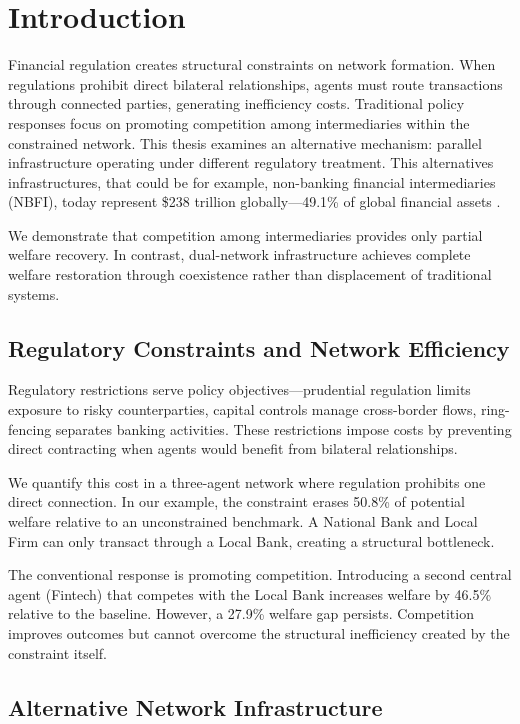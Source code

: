 \chapter{Introduction}\label{chapter:Intro}

Financial regulation creates structural constraints on network formation. When regulations prohibit direct bilateral relationships, agents must route transactions through connected parties, generating inefficiency costs. Traditional policy responses focus on promoting competition among intermediaries within the constrained network. This thesis examines an alternative mechanism: parallel infrastructure operating under different regulatory treatment. This alternatives infrastructures, that could be for example, non-banking financial intermediaries (NBFI), today represent \$238 trillion globally—49.1\% of global financial assets \cite{board_global_2024}.

We demonstrate that competition among intermediaries provides only partial welfare recovery. In contrast, dual-network infrastructure achieves complete welfare restoration through coexistence rather than displacement of traditional systems.

\section{Regulatory Constraints and Network Efficiency}

Regulatory restrictions serve policy objectives—prudential regulation limits exposure to risky counterparties, capital controls manage cross-border flows, ring-fencing separates banking activities. These restrictions impose costs by preventing direct contracting when agents would benefit from bilateral relationships.

We quantify this cost in a three-agent network where regulation prohibits one direct connection. In our example, the constraint erases 50.8\% of potential welfare relative to an unconstrained benchmark. A National Bank and Local Firm can only transact through a Local Bank, creating a structural bottleneck.

The conventional response is promoting competition. Introducing a second central agent (Fintech) that competes with the Local Bank increases welfare by 46.5\% relative to the baseline. However, a 27.9\% welfare gap persists. Competition improves outcomes but cannot overcome the structural inefficiency created by the constraint itself.

\section{Alternative Network Infrastructure}

